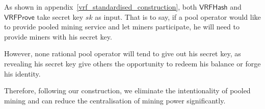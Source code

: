 As shown in appendix~\ref{vrf_standardised_construction}, both $\mathsf{VRFHash}$ and $\mathsf{VRFProve}$ take secret key $sk$ as input.
That is to say, if a pool operator would like to provide pooled mining service and let miners participate, he will need to provide miners with his secret key.

However, none rational pool operator will tend to give out his secret key, as revealing his secret key give others the opportunity to redeem his balance or forge his identity.

Therefore, following our construction, we eliminate the intentionality of pooled mining and can reduce the centralisation of mining power significantly.
